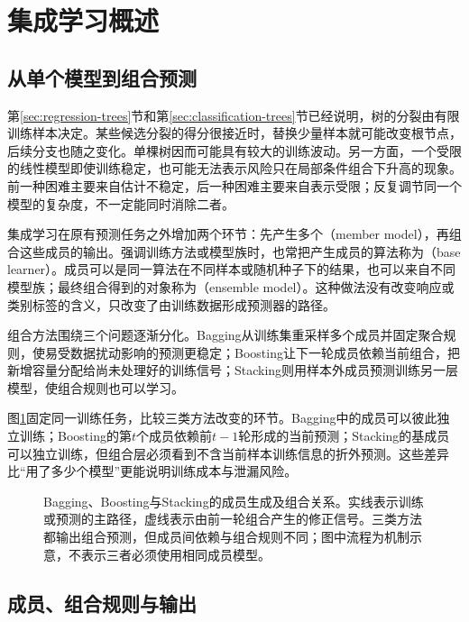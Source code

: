 \section{集成学习概述}
\label{sec:ensemble-overview}

\subsection{从单个模型到组合预测}
\label{sec:ensemble-from-single-to-combination}

第\ref{sec:regression-trees}节和第\ref{sec:classification-trees}节已经说明，树的分裂由有限训练样本决定。某些候选分裂的得分很接近时，替换少量样本就可能改变根节点，后续分支也随之变化。单棵树因而可能具有较大的训练波动。另一方面，一个受限的线性模型即使训练稳定，也可能无法表示风险只在局部条件组合下升高的现象。前一种困难主要来自估计不稳定，后一种困难主要来自表示受限；反复调节同一个模型的复杂度，不一定能同时消除二者。

集成学习在原有预测任务之外增加两个环节：先产生多个（member model），再组合这些成员的输出。强调训练方法或模型族时，也常把产生成员的算法称为（base learner）。成员可以是同一算法在不同样本或随机种子下的结果，也可以来自不同模型族；最终组合得到的对象称为（ensemble model）。这种做法没有改变响应或类别标签的含义，只改变了由训练数据形成预测器的路径。

组合方法围绕三个问题逐渐分化。Bagging从训练集重采样多个成员并固定聚合规则，使易受数据扰动影响的预测更稳定；Boosting让下一轮成员依赖当前组合，把新增容量分配给尚未处理好的训练信号；Stacking则用样本外成员预测训练另一层模型，使组合规则也可以学习。

图\ref{fig:ensemble-three-mechanisms}固定同一训练任务，比较三类方法改变的环节。Bagging中的成员可以彼此独立训练；Boosting的第$t$个成员依赖前$t-1$轮形成的当前预测；Stacking的基成员可以独立训练，但组合层必须看到不含当前样本训练信息的折外预测。这些差异比“用了多少个模型”更能说明训练成本与泄漏风险。

\begin{figure}[htbp]
  \centering
  
  \caption{Bagging、Boosting与Stacking的成员生成及组合关系。实线表示训练或预测的主路径，虚线表示由前一轮组合产生的修正信号。三类方法都输出组合预测，但成员间依赖与组合规则不同；图中流程为机制示意，不表示三者必须使用相同成员模型。}
  \label{fig:ensemble-three-mechanisms}
\end{figure}

\subsection{成员、组合规则与输出}
\label{sec:ensemble-members-combination-output}

